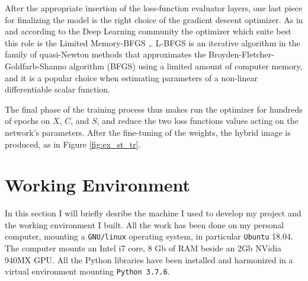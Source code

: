     After the appropriate insertion of the loss-function evaluator layers, one last piece for finalizing the model is the right choice of the gradient descent optimizer. As in \cite{1508.06576} and according to the Deep Learning community the optimizer which suite best this role is the Limited Memory-BFGS \cite{10.1093/imamat/6.1.76},\cite{shanno1970conditioning}. L-BFGS is an iterative algorithm in the family of quasi-Newton methods that approximates the Broyden-Fletcher-Goldfarb-Shanno algorithm (BFGS) using a limited amount of computer memory, and it is a popular choice when estimating parameters of a non-linear differentiable scalar function.

    The final phase of the training process thus makes run the optimizer for hundreds of epochs on $X$, $C$, and $S$, and reduce the two loss functions values acting on the network's parameters. After the fine-tuning of the weights, the hybrid image is produced, as in Figure \ref{fig:ex_st_tr}.

\section{Working Environment} \label{ssec:my_machine}
In this section I will briefly desribe the machine I used to develop my project and the working environment I built.
All the work has been done on my personal computer, mounting a \texttt{GNU/linux} operating system, in particular \texttt{Ubuntu} 18.04. The computer mounts an Intel i7 core, 8 Gb of RAM beside an 2Gb NVidia 940MX GPU.
All the Python libraries have been installed and harmonized in a virtual environment mounting \texttt{Python 3.7.6}.
